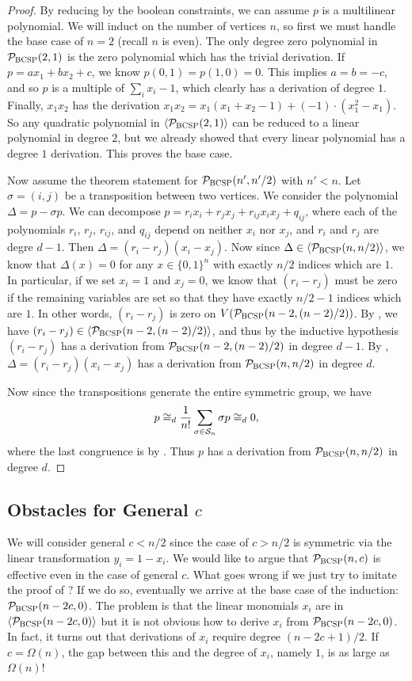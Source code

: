 \begin{proof}
By reducing by the boolean constraints, we can assume $p$ is a multilinear polynomial. 
We will induct on the number of vertices $n$, so first we must handle the base case of $n = 2$ (recall $n$ is even). 
The only degree zero polynomial in $\mathcal P_{\textsc{BCSP}}(2,1)$ is the zero polynomial which has the trivial derivation. 
If $p = ax_1 + bx_2 + c$, we know $p(0,1) = p(1,0) = 0$. This implies $a = b = -c$, and so $p$ is a multiple of $\sum_i x_i - 1$, which clearly has a derivation of degree $1$.
Finally, $x_1x_2$ has the derivation $x_1x_2 = x_1(x_1+x_2-1) + (-1)\cdot(x_1^2 - x_1)$. So any quadratic polynomial in $\langle \mathcal P_{\textsc{BCSP}}(2,1) \rangle$ can be reduced to a linear polynomial in degree $2$, but we already showed that every linear polynomial has a degree $1$ derivation. This proves the base case. 

Now assume the theorem statement for $\mathcal P_{\textsc{BCSP}}(n',n'/2)$ with $n' < n$. 
Let $\sigma = (i,j)$ be a transposition between two vertices. 
We consider the polynomial $\Delta = p - \sigma p$. 
We can decompose $p = r_i x_i + r_j x_j + r_{ij} x_ix_j + q_{ij}$, where each of the polynomials $r_i$, $r_j$, $r_{ij}$, and $q_{ij}$ depend on neither $x_i$ nor $x_j$, and $r_i$ and $r_j$ are degre $d-1$. Then $\Delta = (r_i - r_j)(x_i - x_j)$. Now since $\Delta \in \langle \mathcal P_{\textsc{BCSP}}(n,n/2) \rangle$, we know that $\Delta(x) = 0$ for any $x \in \{0,1\}^n$ with exactly $n/2$ indices which are $1$. In particular, if we set $x_i = 1$ and $x_j = 0$, we know that $(r_i - r_j)$ must be zero if the remaining variables are set so that they have exactly $n/2 - 1$ indices which are $1$. In other words, $(r_i - r_j)$ is zero on $V(\mathcal P_{\textsc{BCSP}}(n-2,(n-2)/2))$. By , we have $(r_i - r_j) \in \langle \mathcal P_{\textsc{BCSP}}(n-2,(n-2)/2) \rangle$, and thus by the inductive hypothesis $(r_i - r_j)$ has a derivation from $\mathcal P_{\textsc{BCSP}}(n-2,(n-2)/2)$ in degree $d-1$. By , $\Delta = (r_i - r_j)(x_i - x_j)$ has a derivation from $\mathcal P_{\textsc{BCSP}}(n,n/2)$ in degree $d$. 

Now since the transpositions generate the entire symmetric group, we have 
\[p \cong_d \frac{1}{n!} \sum_{\sigma \in \mathcal S_n} \sigma p \cong_d 0,\] 
where the last congruence is by . Thus $p$ has a derivation from $\mathcal P_{\textsc{BCSP}}(n,n/2)$ in degree $d$. 
\end{proof}

\subsection{Obstacles for General $c$}
We will consider general $c < n/2$ since the case of $c > n/2$ is symmetric via the linear transformation $y_i = 1 - x_i$.
We would like to argue that $\mathcal P_{\textsc{BCSP}}(n,c)$ is effective even in the case of general $c$.
What goes wrong if we just try to imitate the proof of ?
If we do so, eventually we arrive at the base case of the induction: $\mathcal P_{\textsc{BCSP}}(n-2c,0)$.
The problem is that the linear monomials $x_i$ are in $\langle \mathcal P_{\textsc{BCSP}}(n-2c,0) \rangle$ but it is not obvious how to derive $x_i$ from $\mathcal P_{\textsc{BCSP}}(n-2c,0)$. 
In fact, it turns out that derivations of $x_i$ require degree $(n-2c+1)/2$. If $c = \Omega(n)$, the gap between this and the degree of $x_i$, namely $1$, is as large as $\Omega(n)$!

